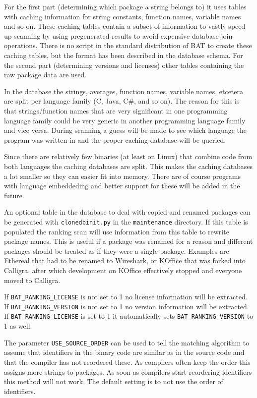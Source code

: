 \documentclass[10pt,a4paper]{article}
\begin{document}
For the first part (determining which package a string belongs to) it uses
tables with caching information for string constants, function names, variable
names and so on. These caching tables contain a subset of information to vastly
speed up scanning by using pregenerated results to avoid expensive database
join operations. There is no script in the standard distribution of BAT to
create these caching tables, but the format has been described in the database
schema. For the second part (determining versions and licenses) other tables
containing the raw package data are used.

In the database the strings, averages, function names, variable names, etcetera
are split per language family (C, Java, C\#, and so on). The reason for this is
that strings/function names that are very significant in one programming
language family could be very generic in another programming language family
and vice versa. During scanning a guess will be made to see which language the
program was written in and the proper caching database will be queried.

Since there are relatively few binaries (at least on Linux) that combine
code from both languages the caching databases are split. This makes the
caching databases a lot smaller so they can easier fit into memory. There are
of course programs with language embeddeding and better support for these will
be added in the future.

An optional table in the database to deal with copied and renamed packages can
be generated with  \texttt{clonedbinit.py} in the \texttt{maintenance}
directory. If this table is populated the ranking scan will use information
from this table to rewrite package names. This is useful if a package was
renamed for a reason and different packages should be treated as if they were
a single package. Examples are Ethereal that had to be renamed to Wireshark,
or KOffice that was forked into Calligra, after which development on KOffice
effectively stopped and everyone moved to Calligra.

If \texttt{BAT\_RANKING\_LICENSE} is not set to 1 no license information will
be extracted. If \texttt{BAT\_RANKING\_VERSION} is not set to 1 no version
information will be extracted. If \texttt{BAT\_RANKING\_LICENSE} is set to 1 it
automatically sets \texttt{BAT\_RANKING\_VERSION} to 1 as well.

The parameter \texttt{USE\_SOURCE\_ORDER} can be used to tell the matching
algorithm to assume that identifiers in the binary code are similar as in the
source code and that the compiler has not reordered these. As compilers often
keep the order this assigns more strings to packages. As soon as compilers
start reordering identifiers this method will not work. The default setting
is to not use the order of identifiers.
\end{document}
